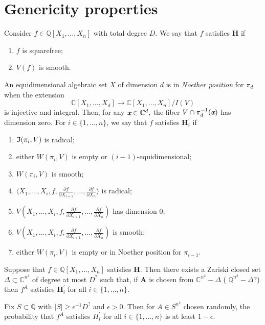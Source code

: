 \documentclass[sigconf]{acmart}
\def\xb{\textit{\textbf{x}}}
\def\C{\mathbb{C}}
\def\Q{\mathbb{Q}}
\def\pa{\partial}
\def\D{\Delta}
\def\I{\frak{I}}
\begin{document}
\section{Genericity properties}
%
Consider $f \in \mathbb{Q}[X_1,\hdots,X_n]$ with total degree $D$.  
We say that $f$ satisfies $\textbf{H}$ if 
%
\begin{enumerate}
    \item $f$ is squarefree;
    \item $V(f)$ is smooth.
\end{enumerate}
%
An equidimensional algebraic set $X$ of dimension $d$ is in \textit{Noether position} for $\pi_d$ when the extension 
\[
\C[X_1,\hdots,X_d] \rightarrow \C[X_1,\hdots,X_n]/I(V)
\] 
is injective and integral.  Then, for any $\xb \in \C^d,$ the fiber 
$V \cap \pi_d^{-1}(\xb)$ has dimension zero. For $i\in\{1,\hdots,n\}$, we say that $f$ satisfies $\textbf{H}_i^{'}$ if 
%
\begin{enumerate}
\item $\I(\pi_i,V)$ is radical;
\item either $W(\pi_i,V)$ is empty or $(i-1)$-equidimensional;
\item $W(\pi_i,V)$ is smooth;
\item $\langle X_1,\hdots,X_i, f,  \frac{\pa f}{\pa X_{i+1}},\hdots,\frac{\pa f}{\pa X_n}\rangle $ is radical; 
\item $V(X_1,\hdots,X_i, f,  \frac{\pa f}{\pa X_{i+1}},\hdots,\frac{\pa f}{\pa X_n})$ has dimension $0$;
\item $V(X_1,\hdots,X_i, f,  \frac{\pa f}{\pa X_{i+1}},\hdots,\frac{\pa f}{\pa X_n})$ is smooth;
\item either $W(\pi_i,V)$ is empty or in Noether position for $\pi_{i-1}$.
\end{enumerate}
%
\begin{theorem}
Suppose that $f \in \Q[X_1,\hdots,X_n]$ satisfies \textbf{H}. Then there exists a Zariski closed set $\D \subset \mathbb{C}^{n^2}$ of degree at most $D^{\textrm{?}}$ such that, if $\textbf{A}$ is chosen from  $\C^{n^2}-\Delta$ ( $\Q^{n^2}-\Delta$?) then $f^A$ satisfies $\textbf{H}_i^{'}$ for all $i \in \{1,\hdots,n\}.$
\end{theorem}
%
\begin{corollary} 
Fix $S \subset \mathbb{Q}$ with $|S| \geq \epsilon^{-1} D^{\textrm{?}}$ and $\epsilon > 0$. Then for $A\in S^{n^2}$ chosen randomly, the probability that $f^A$ satisfies $H_i^{'}$ for all $i \in \{1,\hdots,n\}$ is at least $1-\epsilon.$
\end{corollary}
%
%
%
%
\end{document}
